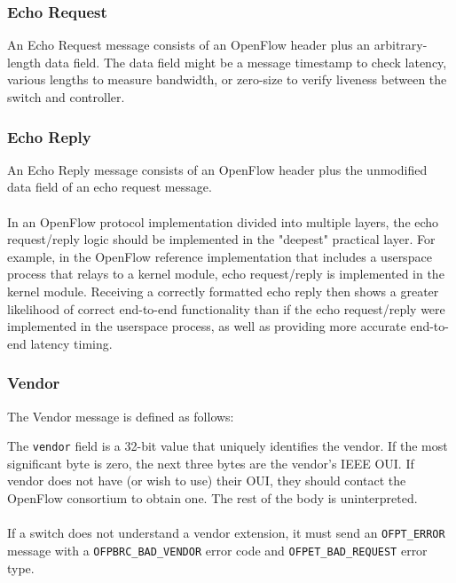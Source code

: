 \subsubsection{Echo Request}
An Echo Request message consists of an OpenFlow header plus an arbitrary-length data field.  The data field might be a message timestamp to check latency, various lengths to measure bandwidth, or zero-size to verify liveness between the switch and controller.

\subsubsection{Echo Reply}
An Echo Reply message consists of an OpenFlow header plus the unmodified data field of an echo request message.
\\\\
In an OpenFlow protocol implementation divided into multiple layers, the echo request/reply logic should be implemented in the "deepest" practical layer.  For example, in the OpenFlow reference implementation that includes a userspace process that relays to a kernel module, echo request/reply is implemented in the kernel module.  Receiving a correctly formatted echo reply then shows a greater likelihood of correct end-to-end functionality than if the echo request/reply were implemented in the userspace process, as well as providing more accurate end-to-end latency timing.

\subsubsection{Vendor}
The Vendor message is defined as follows:


The \verb|vendor| field is a 32-bit value that uniquely identifies the vendor. If the most significant byte is zero, the next three bytes are the vendor's IEEE OUI. If vendor does not have (or wish to use) their OUI, they should contact the OpenFlow consortium to obtain one. The rest of the body is uninterpreted.
\\\\
If a switch does not understand a vendor extension, it must send an \verb|OFPT_ERROR| message with a \verb|OFPBRC_BAD_VENDOR| error code and \verb|OFPET_BAD_REQUEST| error type. 

